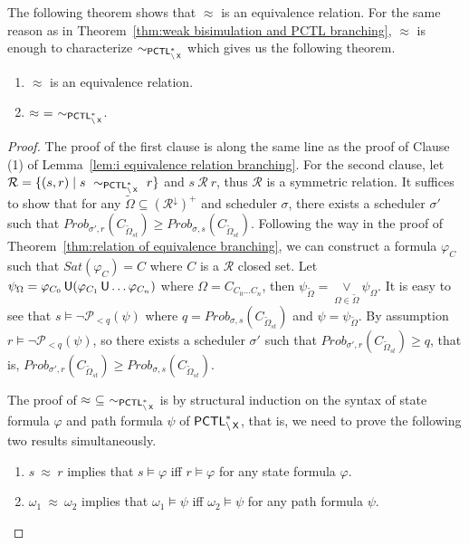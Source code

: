 \documentclass{LMCS}
\def\phi{\varphi}
\DeclareMathOperator{\U}{\text{\sf U}}
\DeclareMathOperator{\X}{\text{\sf X}}
\def\tilde{\widetilde}
\newcommand{\WBS}{\approx}
\newcommand{\PCTL}{{\sf PCTL}}
\newcommand{\MC}[1]{\mathcal{#1}}
\newcommand{\EPCTLSWN}{\sim_{\PCTL^{*}_{\backslash\X}}}
\newcommand{\MEASURE}{\mathit{Prob}}
\newcommand{\DOWNWARD}[2]{#1^{\downarrow}#2}
\begin{document}
The following theorem shows that $\WBS$ is an equivalence relation. For the same reason as in Theorem~\ref{thm:weak bisimulation and PCTL branching}, $\WBS$ is enough to characterize $\EPCTLSWN$ which gives us the following theorem.
\begin{thm}\label{thm:weak bisimulation and PCTL}\hfill
\begin{enumerate}[\em(1)]
\item $\WBS$ is an equivalence relation.
\item $\WBS~=~\EPCTLSWN$.
\end{enumerate}
\end{thm}
\begin{proof}
The proof of the first clause is along the
  same line as the proof of Clause (1) of Lemma~\ref{lem:i equivalence
    relation branching}.
For the second clause, let $\MC{R}=\{(s,r)\mid s~\EPCTLSWN~r\}$ and $s~\MC{R}~r$, thus $\MC{R}$ is a symmetric relation.
  It suffices to show that for any $\tilde{\Omega}\subseteq (\DOWNWARD{\MC{R}}{})^+$ and
  scheduler $\sigma$, there exists a scheduler $\sigma'$ such that
  $\MEASURE_{\sigma',r}(C_{\tilde{\Omega}_{\mathit{st}}})\geq\MEASURE_{\sigma,s}(C_{\tilde{\Omega}_{\mathit{st}}})$.
  Following the way in the
  proof of Theorem~\ref{thm:relation of equivalence branching}, we can
  construct a formula $\phi_C$ such that $\mathit{Sat}(\phi_C)=C$
  where $C$ is a $\MC{R}$ closed set. Let
  $\psi_{\Omega}=\phi_{C_0}\U(\phi_{C_1}\U\ldots\phi_{C_n})$ where
  $\Omega=C_{C_0\ldots C_n}$, then
  $\psi_{\tilde{\Omega}}=\mathop{\lor}\limits_{\Omega\in\tilde{\Omega}}\psi_{\Omega}$. It
  is easy to see that $s\models\neg\MC{P}_{<q}(\psi)$ where
  $q=\MEASURE_{\sigma,s}(C_{\tilde{\Omega}_{\mathit{st}}})$ and
  $\psi=\psi_{\tilde{\Omega}}$. By assumption $r\models\neg
  \MC{P}_{<q}(\psi)$, so there exists a scheduler $\sigma'$ such that
  $\MEASURE_{\sigma',r}(C_{\tilde{\Omega}_{\mathit{st}}})\geq q$, that
  is,
  $\MEASURE_{\sigma',r}(C_{\tilde{\Omega}_{\mathit{st}}})\geq\MEASURE_{\sigma,s}(C_{\tilde{\Omega}_{\mathit{st}}})$.

    The proof of $\WBS~\subseteq~\EPCTLSWN$ is by structural induction on the syntax of state formula $\phi$ and path formula $\psi$ of $\PCTL^{*}_{\backslash\X}$, that is, we need to prove the following two results simultaneously.
\begin{enumerate}[(1)]
\item $s~\WBS~r$ implies that $s\models\phi$ iff $r\models\phi$ for any state formula $\phi$.
\item $\omega_1~\WBS~\omega_2$ implies that $\omega_1\models\psi$ iff $\omega_2\models\psi$ for any path formula $\psi$.
\end{enumerate}


\end{proof}
\end{document}
